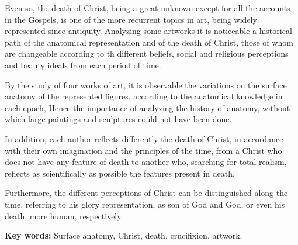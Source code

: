 Even so, the death of Christ, being a great unknown except for all the accounts in the Gospels, is one of the more recurrent topics in art, being widely represented since antiquity. Analyzing some artworks it is noticeable a historical path of the anatomical representation and of the death of Christ, those of whom are changeable according to th different beliefs, social and religious perceptions and beauty ideals from each period of time.

By the study of four works of art, it is observable the variations on the surface anatomy of the represented figures, according to the anatomical knowledge in each epoch, %
Hence the importance of analyzing the history of anatomy, without which large paintings and sculptures could not have been done.

In addition, each author reflects differently the death of Christ, in accordance with their own imagination and the principles of the time, from a Christ who does not have any feature of death to another who, searching for total realism, reflects as scientifically as possible %
the features present in %
death.


Furthermore, the different perceptions of Christ can be distinguished along the time, referring to his glory representation, as son of God and God, or even his death, more human, respectively.


\textbf{Key words:}
Surface anatomy, Christ, death, crucifixion, artwork.